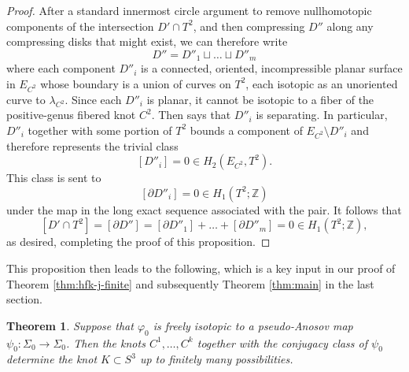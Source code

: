 \documentclass[11pt]{amsart}
\newtheorem {theorem}{Theorem}
\numberwithin{equation}{section}
\numberwithin{theorem}{section}
\theoremstyle{definition}
\newcommand{\Z}{\mathbb{Z}}
\begin{document}
\begin{proof}
After a standard innermost circle argument to remove nullhomotopic components of the intersection $D'\cap T^2$, and then compressing $D''$ along any compressing disks that might exist, we can therefore write \[D'' = D''_1\sqcup \dots \sqcup D''_m\] where each component $D''_i$ is a connected, oriented, incompressible planar surface in $E_{C^2}$ whose boundary is a union of curves on $T^2$, each isotopic as an unoriented curve to $\lambda_{C^2}$. Since  each $D''_i$ is planar, it cannot be isotopic to a fiber of the positive-genus fibered knot $C^2$. Then \cite[Proposition 4.7]{bs-apoly} says that $D''_i$ is separating. In particular, $D''_i$ together with some portion of $T^2$ bounds a component of $E_{C^2}\setminus D''_i$ and therefore represents the trivial class \[[D''_i]=0\in H_2(E_{C^2},T^2).\] This class is  sent to \[[\partial D''_i] = 0 \in H_1(T^2;\Z)\] under the map in the long exact sequence associated with the pair. It follows that \[[D'\cap T^2] = [\partial D''] = [\partial D''_1] + \dots + [\partial D''_m] = 0\in H_1(T^2;\Z),\] as desired, completing the proof of this proposition.
\end{proof}

This proposition then leads to the following, which is a key input in our proof of Theorem \ref{thm:hfk-j-finite} and subsequently Theorem \ref{thm:main} in the last section.

\begin{theorem}\label{thm:determine-C}
Suppose that $\varphi_0$ is freely isotopic to a pseudo-Anosov map $\psi_0:\Sigma_0\to\Sigma_0$. Then the knots $C^1,\dots,C^k$ together with the conjugacy class of $\psi_0$ determine the knot $K\subset S^3$ up to finitely many possibilities.
\end{theorem}
\end{document}
